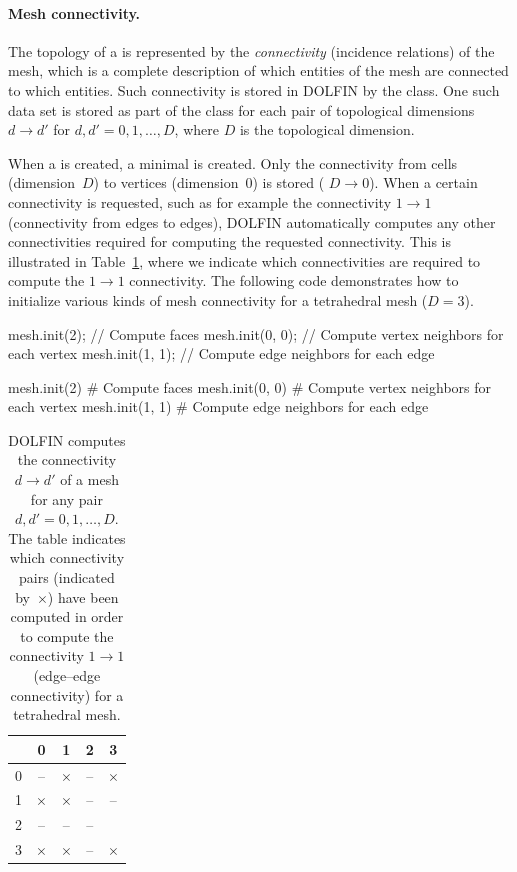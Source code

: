 \paragraph{Mesh connectivity.}

The topology of a  is represented by the \emph{connectivity}
(incidence relations) of the mesh, which is a complete description of
which entities of the mesh are connected to which entities. Such
connectivity is stored in DOLFIN by the 
class. One such data set is stored as part of the class
 for each pair of topological dimensions $d
\rightarrow d'$ for $d, d' = 0, 1, \ldots, D$, where $D$ is the
topological dimension.

When a  is created, a minimal  is created.
Only the connectivity from cells (dimension~$D$) to vertices
(dimension~$0$) is stored ( $D \rightarrow 0$).
When a certain connectivity is requested, such as for example the connectivity
$1 \rightarrow 1$ (connectivity from edges to edges), DOLFIN automatically
computes any other connectivities required for computing the requested
connectivity. This is illustrated in Table~\ref{tab:logg-2:connectivity},
where we indicate which connectivities are required to compute the $1
\rightarrow 1$ connectivity.  The following code demonstrates how to
initialize various kinds of mesh connectivity for a tetrahedral mesh
($D = 3$).
\begin{c++}
mesh.init(2);    // Compute faces
mesh.init(0, 0); // Compute vertex neighbors for each vertex
mesh.init(1, 1); // Compute edge neighbors for each edge
\end{c++}
\begin{python}
mesh.init(2)      # Compute faces
mesh.init(0, 0)   # Compute vertex neighbors for each vertex
mesh.init(1, 1)   # Compute edge neighbors for each edge
\end{python}

\begin{table}
  \begin{center}
    \begin{tabular}{c|cccc}
      & 0 & 1 & 2 & 3 \\
      \hline
      0 & -- & $\times$ & -- & $\times$ \\
      1 & $\times$ & $\times$ & -- & -- \\
      2 & -- & -- & -- \\
      3 & $\times$ & $\times$ & -- & $\times$ \\
    \end{tabular}
  \end{center}
  \caption{DOLFIN computes the connectivity $d \rightarrow d'$ of a
    mesh for any pair $d, d' = 0, 1, \ldots, D$. The table
    indicates which connectivity pairs (indicated by~$\times$) have
    been computed in order to compute the connectivity $1 \rightarrow
    1$ (edge--edge connectivity) for a tetrahedral mesh.}
\label{tab:logg-2:connectivity}
\end{table}

